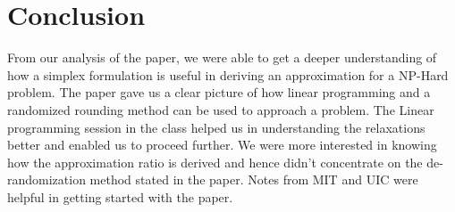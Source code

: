 \documentclass[11pt]{article}
\begin{document}
\section{Conclusion}
From our analysis of the paper, we were able to get a deeper understanding of how a simplex formulation is useful in deriving an approximation for a NP-Hard problem. The paper gave us a clear picture of how linear programming and a randomized rounding method can be used to approach a problem. The Linear programming session in the class helped us in understanding the relaxations better and enabled us to proceed further. We were more interested in knowing how the approximation ratio is derived and hence didn't concentrate on the de-randomization method stated in the paper. Notes from MIT\cite{mit_content} and UIC\cite{illinois_content} were helpful in getting started with the paper.   

{ %
  \small 
  
  
}
\end{document}
